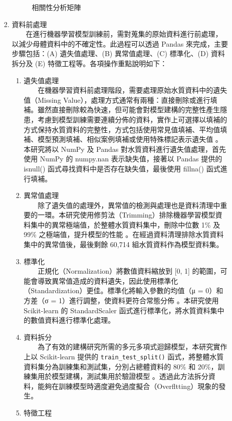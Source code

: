 \documentclass[12pt,a4paper]{article}
\begin{document}
\begin{enumerate}
\begin{enumerate}[label=\arabic*.]
\begin{enumerate}[label=2-2-\arabic*.]
\begin{figure}[H]
                \caption{相關性分析矩陣}
                \label{fig:correlation_matrix}
            \end{figure}
        \item 資料前處理\\
        　　在進行機器學習模型訓練前，需對蒐集的原始資料進行前處理，以減少母體資料中的不確定性。此過程可以透過 Pandas 來完成，主要步驟包括：(A) 遺失值處理、(B) 異常值處理、(C) 標準化、(D) 資料拆分及 (E) 特徵工程等。各項操作重點說明如下：
            \begin{enumerate}[label=\Alph*.]
                \item 遺失值處理\\
                　　在機器學習資料前處理階段，需要處理原始水質資料中的遺失值（Missing Value），處理方式通常有兩種：直接刪除或進行填補。雖然直接刪除較為快速，但可能會對模型建構的完整性產生隱患，考慮到模型訓練需要連續分佈的資料，實作上可選擇以填補的方式保持水質資料的完整性，方式包括使用常見值填補、平均值填補、模型預測填補、相似案例填補或使用特殊標記表示遺失值 \cite{ref24}。本研究將以 NumPy 及 Pandas 對水質資料進行遺失值處理，首先使用 NumPy 的 numpy.nan 表示缺失值，接著以 Pandas 提供的 isnull() 函式尋找資料中是否存在缺失值，最後使用 fillna() 函式進行填補。
                \item 異常值處理\\
                　　除了遺失值的處理外，異常值的檢測與處理也是資料清理中重要的一環。本研究使用修剪法（Trimming）排除機器學習模型資料集中的異常極端值，於整體水質資料集中，刪除中位數 1\% 及 99\% 之極端值，提升模型的性能 \cite{ref25}。在經過資料清理排除水質資料集中的異常值後，最後剩餘 60,714 組水質資料作為模型資料集。
                \item 標準化\\
                　　正規化（Normalization）將數值資料縮放到 [0, 1] 的範圍，可能會導致異常值造成的資料遺失，因此使用標準化（Standardization）更佳。標準化將輸入參數的均值（μ = 0）和方差（σ = 1）進行調整，使資料更符合常態分佈 \cite{ref26}。本研究使用 Scikit-learn 的 StandardScaler 函式進行標準化，將水質資料集中的數值資料進行標準化處理。
                \item 資料拆分\\
                　　為了有效的建構研究所需的多元多項式迴歸模型，本研究實作上以 Scikit-learn 提供的 \texttt{train\_test\_split()} 函式，將整體水質資料集分為訓練集和測試集，分別占總體資料的 80\% 和 20\%，訓練集用於模型建構，測試集用於驗證模型 \cite{ref27}。透過此方法拆分資料，能夠在訓練模型時適度避免過度擬合（Overfltting）現象的發生。
                \item 特徵工程\\

\end{enumerate}
\end{enumerate}
\end{enumerate}
\end{enumerate}
\end{document}
